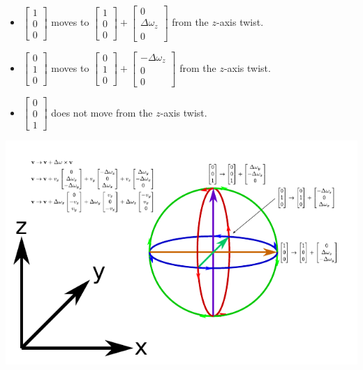 \documentclass{article}
\begin{document}
\begin{itemize}
\item \(\begin{bmatrix} 1 \\ 0 \\ 0 \end{bmatrix}\) moves to \(\begin{bmatrix} 1 \\ 0 \\ 0 \end{bmatrix} + \begin{bmatrix} 0 \\ \Delta\omega_z \\ 0 \end{bmatrix}\) from the \(z\)-axis twist.
\item \(\begin{bmatrix} 0 \\ 1 \\ 0 \end{bmatrix}\) moves to \(\begin{bmatrix} 0 \\ 1 \\ 0 \end{bmatrix} + \begin{bmatrix} -\Delta\omega_z \\ 0 \\ 0 \end{bmatrix}\) from the \(z\)-axis twist.
\item \(\begin{bmatrix} 0 \\ 0 \\ 1 \end{bmatrix}\) does not move from the \(z\)-axis twist.
\end{itemize}   

\begin{center}
\includegraphics[width = \textwidth]{infinitesimal_torsion}
\end{center}
\end{document}
